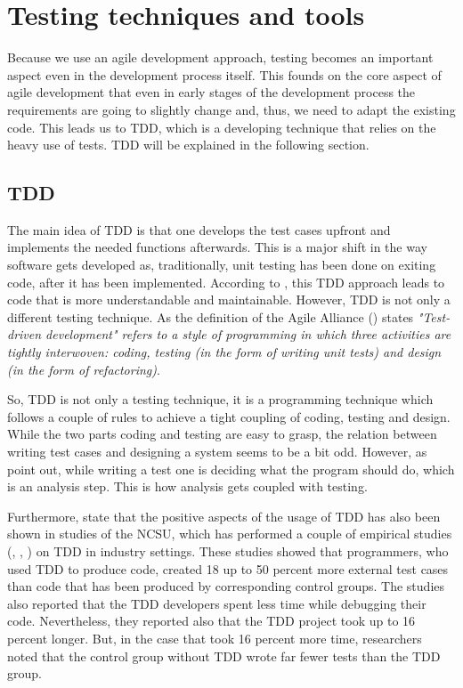 \section{Testing techniques and tools}	
Because we use an agile development approach, testing becomes an important aspect even in the development process itself. This founds on the core aspect of agile development that even in early stages of the development process the requirements are going to slightly change and, thus, we need to adapt the existing code. This leads us to \ac{TDD}, which is a developing technique that relies on the heavy use of tests. \ac{TDD} will be explained in the following section. 

\subsection{TDD}
The main idea of \ac{TDD} is that one develops the test cases upfront and implements the needed functions afterwards. This is a major shift in the way software gets developed as, traditionally, unit testing has been done on exiting code, after it has been implemented. According to \cite{nerur2005}, this \ac{TDD} approach leads to code that is more understandable and maintainable. However, \ac{TDD} is not only a different testing technique. As the definition of the Agile Alliance (\cite{GAA2015}) states \textit{"Test-driven development" refers to a style of programming in which three activities are tightly interwoven: coding, testing (in the form of writing unit tests) and design (in the form of refactoring)}. 

So, \ac{TDD} is not only a testing technique, it is a programming technique which follows a couple of rules to achieve a tight coupling of coding, testing and design. While the two parts coding and testing are easy to grasp, the relation between writing test cases and designing a system seems to be a bit odd. However, as \cite{Janzen2005} point out, while writing a test one is deciding what the program should do, which is an analysis step. This is how analysis gets coupled with testing.

Furthermore, \cite{Janzen2005} state that the positive aspects of the usage of \ac{TDD} has also been shown in studies of the \ac{NCSU}, which has performed a couple of empirical studies (\cite{George2004}, \cite{max03}, \cite{Williams2003}) on TDD in industry settings.
These studies showed that programmers, who used \ac{TDD} to produce code, created 18 up to 50 percent more external test cases than code that has been produced by corresponding control groups. The studies also reported that the \ac{TDD} developers spent less time while debugging their code. Nevertheless, they reported also that the \ac{TDD} project took up to 16 percent longer. But, in the case that took 16 percent more time, researchers noted that the control group without \ac{TDD} wrote far fewer tests than the \ac{TDD} group. 

